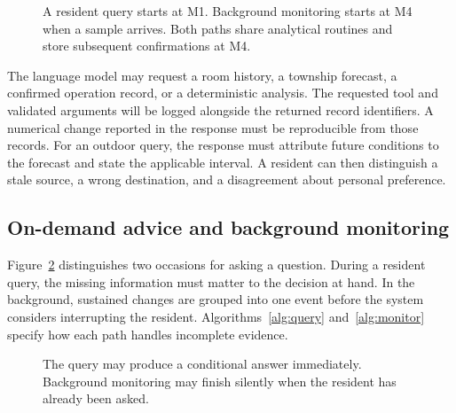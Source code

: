 \begin{figure}[t]
\centering

\caption{A resident query starts at M1. Background monitoring starts at M4 when a sample arrives. Both paths share analytical routines and store subsequent confirmations at M4.}
\label{fig:arch}
\end{figure}

The language model may request a room history, a township forecast, a confirmed operation record, or a deterministic analysis. The requested tool and validated arguments will be logged alongside the returned record identifiers. A numerical change reported in the response must be reproducible from those records. For an outdoor query, the response must attribute future conditions to the forecast and state the applicable interval. A resident can then distinguish a stale source, a wrong destination, and a disagreement about personal preference.

\subsection{On-demand advice and background monitoring}
Figure~\ref{fig:paths} distinguishes two occasions for asking a question. During a resident query, the missing information must matter to the decision at hand. In the background, sustained changes are grouped into one event before the system considers interrupting the resident. Algorithms~\ref{alg:query} and~\ref{alg:monitor} specify how each path handles incomplete evidence.

\begin{figure}[t]
\centering

\caption{The query may produce a conditional answer immediately. Background monitoring may finish silently when the resident has already been asked.}
\label{fig:paths}
\end{figure}

